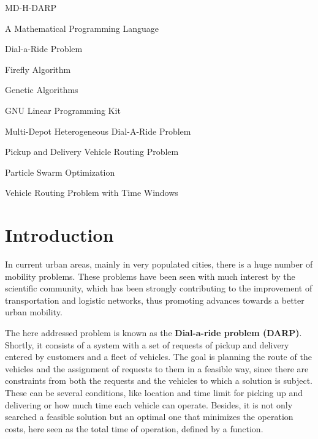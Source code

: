 \documentclass[tuberlin,cic,tc,openright,english,noabntcite,oneside]{iiufrgs}
\begin{document}
\begin{listofabbrv}{MD-H-DARP}
	\item[AMPL] A Mathematical Programming Language
    \item[DARP] Dial-a-Ride Problem
    \item[FA] Firefly Algorithm
    \item[GA] Genetic Algorithms
    \item[GLPK] GNU Linear Programming Kit
    \item[MD-H-DARP] Multi-Depot Heterogeneous Dial-A-Ride Problem
    \item[PDVRP] Pickup and Delivery Vehicle Routing Problem
    \item[PSO] Particle Swarm Optimization
    \item[VRPTW] Vehicle Routing Problem with Time Windows
\end{listofabbrv}


\tableofcontents


\chapter{Introduction}
In current urban areas, mainly in very populated cities, there is a huge number of mobility problems. These problems have been seen with much interest by the scientific community, which has been strongly contributing to the improvement of transportation and logistic networks, thus promoting advances towards a better urban mobility.

The here addressed problem is known as the \textbf{Dial-a-ride problem (DARP)}. Shortly, it consists of a system with a set of requests of pickup and delivery entered by customers and a fleet of vehicles. The goal is planning the route of the vehicles and the assignment of requests to them in a feasible way, since there are constraints from both the requests and the vehicles to which a solution is subject. These can be several conditions, like location and time limit for picking up and delivering or how much time each vehicle can operate. Besides, it is not only searched a feasible solution but an optimal one that minimizes the operation costs, here seen as the total time of operation, defined by a function.
\end{document}
